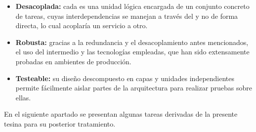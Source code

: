 \begin{itemize}
  \item \textbf{Desacoplada:} cada  es una unidad lógica encargada de un conjunto concreto de tareas, cuyas interdependencias se manejan a través del  y no de forma directa, lo cual acoplaría un servicio a otro.
  \item \textbf{Robusta:} gracias a la redundancia y el desacoplamiento antes mencionados, el uso del  intermedio y las tecnologías empleadas, que han sido extensamente probadas en ambientes de producción.
  \item \textbf{Testeable:} su diseño descompuesto en capas y unidades independientes permite fácilmente aislar partes de la arquitectura para realizar pruebas sobre ellas.
\end{itemize}

En el siguiente apartado se presentan algunas tareas derivadas de la presente tesina para su posterior tratamiento.

